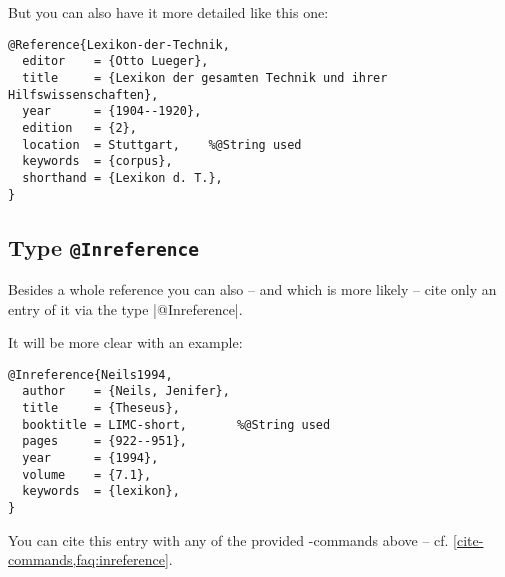 \documentclass[a4paper,
10pt,
greek,
french,
spanish,
italian,
ngerman,
english
]{ltxdoc}
\begin{document}
But you can also have it  more detailed  like this one:
\begin{lstlisting}[style=bibentry,label=Lexikon-der-Technik,caption={{@}Reference\{Lexikon-der-Technik,…\} }]
@Reference{Lexikon-der-Technik,
  editor    = {Otto Lueger},
  title     = {Lexikon der gesamten Technik und ihrer Hilfswissenschaften},
  year      = {1904--1920},
  edition   = {2},
  location  = Stuttgart, 	%@String used
  keywords  = {corpus},
  shorthand = {Lexikon d. T.},
}
\end{lstlisting}

 \subsection{Type \texttt{@Inreference}}\label{inreference}
Besides a whole reference you can also -- and which is more likely -- cite only an entry of it via the type  |@Inreference|.

It will be more clear with an example:
  \begin{lstlisting}[style=bibentry,label=Neils1994,caption={{@}Inreference\{Neils1994,…\} }]
@Inreference{Neils1994,
  author    = {Neils, Jenifer},
  title     = {Theseus},
  booktitle = LIMC-short,		%@String used
  pages     = {922--951},
  year      = {1994},
  volume    = {7.1},
  keywords  = {lexikon},
}
\end{lstlisting}
You can cite this entry with any of the provided -commands above -- cf. \cref{cite-commands,faq:inreference}.
\end{document}
